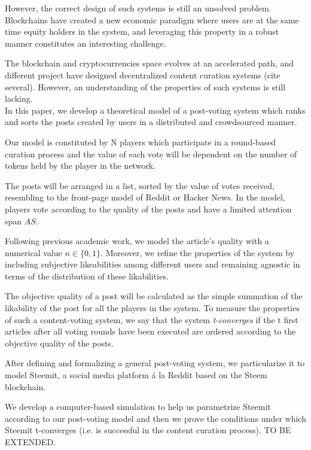    However, the correct design of such systems is still an unsolved problem. Blockchains have created a new economic paradigm where users are at the same time equity holders in the system, and leveraging this property in a robust manner constitutes an interesting challenge. 
   
   The blockchain and cryptocurrencies space evolves at an accelerated path, and different project have designed decentralized content curation systems (cite several). However, an understanding of the properties of such systems is still lacking.\\
  
  
  In this paper, we develop a theoretical model of a post-voting system which ranks and sorts the posts created by users in a distributed and crowdsourced manner. 
  
  Our model is constituted by N players which participate in a round-based curation process and the value of each vote will be dependent on the number of tokens held by the player in the network.
  
   The posts will be arranged in a list, sorted by the value of votes received, resembling to the front-page model of Reddit or Hacker News. In the model, players vote according to the quality of the posts and have a limited attention span $AS$. 
   
   Following previous academic work, we model the article's quality with a numerical value $n \in \lbrace 0,1 \rbrace$. Moreover, we refine the properties of the system by including subjective likeabilities among different users and remaining agnostic in terms of the distribution of these likabilities. 
   
   The objective quality of a post will be calculated as the simple summation of the likability of the post for all the players in the system. To measure the properties of such a content-voting system, we say that the system \textit{t-converges} if the t first articles after all voting rounds have been executed are ordered according to the objective quality of the posts.
   
   
  After defining and formalizing a general post-voting system, we particularize it to model Steemit, a social media platform á la Reddit based on the Steem blockchain.
  
   We develop a computer-based simulation to help us parametrize Steemit according to our post-voting model and then we prove the conditions under which Steemit t-converges (i.e. is successful in the content curation process). TO BE EXTENDED.\\
  
